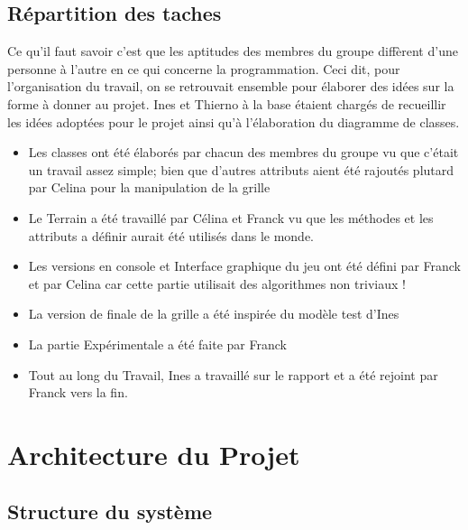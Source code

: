 \documentclass[a4paper,12pt]{article} %
\begin{document}
\subsection{Répartition des taches}
Ce qu'il faut savoir c'est que les aptitudes des membres du groupe diffèrent d'une personne à l'autre en ce qui concerne la programmation. 
Ceci dit, pour l'organisation du travail, on se retrouvait ensemble pour élaborer des idées sur la forme à donner au projet. Ines et Thierno à la base étaient chargés de recueillir les idées adoptées pour le projet ainsi qu'à l'élaboration du diagramme de classes.
\begin{itemize}
    \item Les classes ont été élaborés par chacun des membres du groupe vu que c'était un travail assez simple; bien que d'autres attributs aient été rajoutés plutard par Celina pour la manipulation de la grille
    \item Le Terrain a été travaillé par Célina et Franck vu que les méthodes et les attributs a définir aurait été utilisés dans le monde.
    \item Les versions en console et Interface graphique du jeu ont été défini par Franck et par Celina car cette partie utilisait des algorithmes non triviaux !
    \item La version de finale de la grille a été inspirée du modèle test d'Ines
    \item La partie Expérimentale a été faite par Franck
    \item Tout au long du Travail, Ines a travaillé sur le rapport et a été rejoint par Franck vers la fin.
\end{itemize}


\section{Architecture du Projet}

\subsection{Structure du système}
\end{document}
